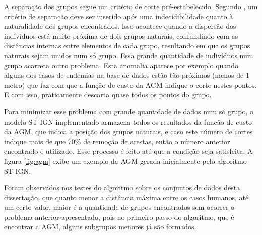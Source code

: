 A separação dos grupos segue um critério de corte pré-estabelecido. Segundo \cite{simposioNeg2003}, um critério de separação deve ser inserido após uma indecidibilidade quanto à naturalidade dos grupos encontrados. Isso acontece quando a dispersão dos indivíduos está muito próxima de dois grupos naturais, confundindo com as distâncias internas entre elementos de cada grupo, resultando em que os grupos naturais sejam unidos num só grupo. Essa grande quantidade de indivíduos num grupo acarreta outro problema. Esta anomalia aparece por exemplo quando alguns dos casos de endemias na base de dados estão tão próximos (menos de 1 metro) que faz com que a função de custo da \acrshort{AGM} indique o corte nestes pontos. E com isso, praticamente descarta quase todos os pontos do grupo.

Para minimizar esse problema com grande quantidade de dados num só grupo, o modelo \acrshort{ST-IGN} implementado armazena todos os resultados da funcão de custo da \acrshort{AGM}, que indica a posição dos grupos naturais, e caso este número de cortes indique mais de que 70\% de remoção de arestas, então o número anterior encontrado é utilizado. Esse processo é feito até que a condição seja satisfeita. A figura \ref{fig:agm} exibe um exemplo da \acrshort{AGM} gerada inicialmente pelo algoritmo \acrshort{ST-IGN}.


Foram observados nos testes do algoritmo sobre os conjuntos de dados desta dissertação, que quanto menor a distância máxima entre os casos humanos, até um certo valor, maior é a quantidade de grupos encontrados sem ocorrer o problema anterior apresentado, pois no primeiro passo do algoritmo, que é encontrar a \acrshort{AGM}, alguns subgrupos menores já são formados.

\begin{figure}[!ht]
	\centering	
\end{figure}
\FloatBarrier

